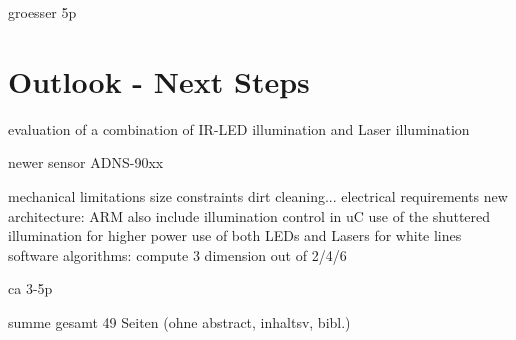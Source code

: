 \documentclass[12pt,a4paper]{article}
\begin{document}
groesser 5p

\section{Outlook - Next Steps}

  evaluation of a combination of IR-LED illumination and Laser illumination

  newer sensor ADNS-90xx

  mechanical limitations
    size constraints
    dirt cleaning...
  electrical requirements
    new architecture: ARM
    also include illumination control in uC
      use of the shuttered illumination for higher power 
      use of both LEDs and Lasers for white lines
  software algorithms: compute 3 dimension out of 2/4/6

ca 3-5p


summe gesamt 49 Seiten (ohne abstract, inhaltsv, bibl.)


\label{Bibliography}


%
\end{document}
